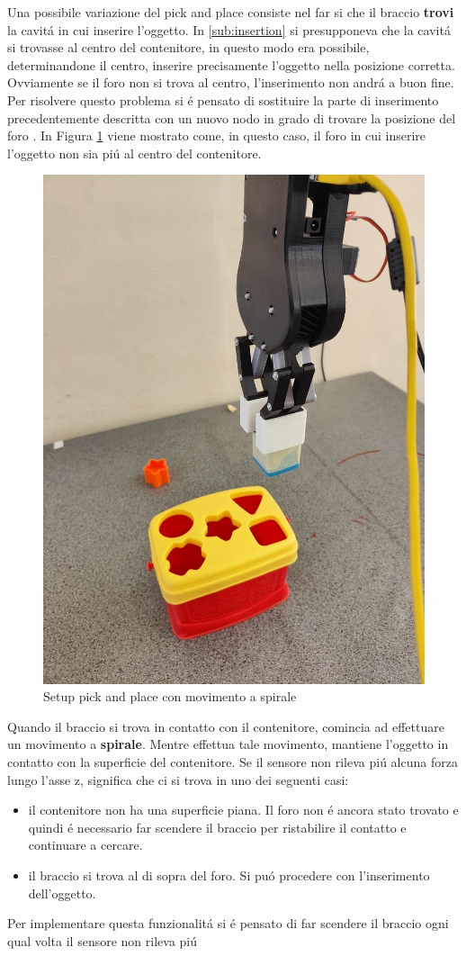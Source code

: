 Una possibile variazione del pick and place consiste nel far si che il braccio \textbf{trovi} la cavit\'{a} in cui inserire l'oggetto. 
In \ref{sub:insertion} si presupponeva che la cavit\'{a} si trovasse al centro del contenitore, in questo modo era possibile, 
determinandone il centro, inserire precisamente l'oggetto nella posizione corretta. Ovviamente se il foro non si trova al centro, 
l'inserimento non andr\'{a} a buon fine. Per risolvere questo problema si \'{e} pensato di sostituire la parte di inserimento 
precedentemente descritta con un nuovo nodo in grado di trovare la posizione del foro \cite{spiral}. 
In Figura \ref{fig:spiral_pick_place} viene mostrato come, in questo caso, il foro in cui inserire l'oggetto non sia pi\'{u} al centro 
del contenitore. 
\begin{figure}[H]
    \centering
    \includegraphics*[height=0.45\textwidth]{images/spiral_pick_place.jpg}
    \caption{Setup pick and place con movimento a spirale}
    \label{fig:spiral_pick_place}
\end{figure}
Quando il braccio si trova in contatto con il contenitore, comincia ad effettuare un movimento a \textbf{spirale}. 
Mentre effettua tale movimento, mantiene l'oggetto in contatto con la superficie del contenitore. Se il sensore 
non rileva pi\'{u} alcuna forza lungo l'asse z, significa che ci si trova in uno dei seguenti casi:
\begin{itemize}
    \item il contenitore non ha una superficie piana. Il foro non \'{e} ancora stato trovato e quindi \'{e} necessario far scendere 
    il braccio per ristabilire il contatto e continuare a cercare.
    \item il braccio si trova al di sopra del foro. Si pu\'{o} procedere con l'inserimento dell'oggetto.
\end{itemize} 
Per implementare questa funzionalit\'{a} si \'{e} pensato di far scendere il braccio ogni qual volta il sensore non rileva pi\'{u}
